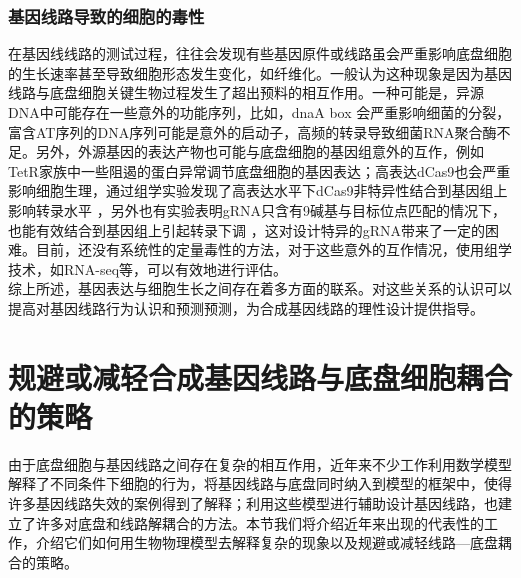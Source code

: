 \documentclass[b5paper,11pt,onecolumn,twoside,UTF8]{article}
\begin{document}
\subsubsection*{基因线路导致的细胞的毒性}
在基因线线路的测试过程，往往会发现有些基因原件或线路虽会严重影响底盘细胞的生长速率甚至导致细胞形态发生变化，如纤维化。一般认为这种现象是因为基因线路与底盘细胞关键生物过程发生了超出预料的相互作用。一种可能是，异源DNA中可能存在一些意外的功能序列，比如，dnaA box 会严重影响细菌的分裂\cite{Kimelman2012}，富含AT序列的DNA序列可能是意外的启动子，高频的转录导致细菌RNA聚合酶不足\cite{Lamberte2017}。另外，外源基因的表达产物也可能与底盘细胞的基因组意外的互作，例如TetR家族中一些阻遏的蛋白异常调节底盘细胞的基因表达\cite{Stanton2014,Hasnain2019}；高表达dCas9也会严重影响细胞生理，通过组学实验发现了高表达水平下dCas9非特异性结合到基因组上影响转录水平 \cite{cho2018}，另外也有实验表明gRNA只含有9碱基与目标位点匹配的情况下，也能有效结合到基因组上引起转录下调 \cite{Cui2018}，这对设计特异的gRNA带来了一定的困难。目前，还没有系统性的定量毒性的方法，对于这些意外的互作情况，使用组学技术，如RNA-seq等，可以有效地进行评估。\\
\indent 综上所述，基因表达与细胞生长之间存在着多方面的联系。对这些关系的认识可以提高对基因线路行为认识和预测预测，为合成基因线路的理性设计提供指导。
\section{规避或减轻合成基因线路与底盘细胞耦合的策略}
由于底盘细胞与基因线路之间存在复杂的相互作用，近年来不少工作利用数学模型解释了不同条件下细胞的行为，将基因线路与底盘同时纳入到模型的框架中，使得许多基因线路失效的案例得到了解释；利用这些模型进行辅助设计基因线路，也建立了许多对底盘和线路解耦合的方法。本节我们将介绍近年来出现的代表性的工作，介绍它们如何用生物物理模型去解释复杂的现象以及规避或减轻线路---底盘耦合的策略。
\end{document}
